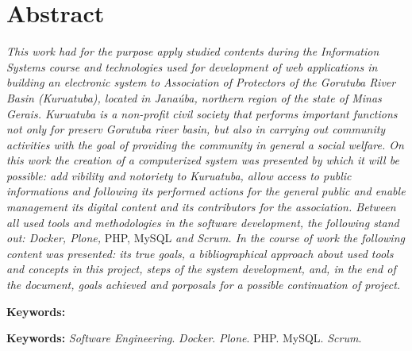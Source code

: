 \chapter*{Abstract}
\vspace{0.4cm}
\noindent \textit{This work had for  the purpose apply studied contents during the Information Systems course and technologies  used for development of web applications   in building an electronic system to Association of Protectors of the Gorutuba River Basin (Kuruatuba), located in Janaúba, northern region of the state of Minas Gerais. 
Kuruatuba is a 
non-profit civil society that performs important functions not only for preserv Gorutuba river basin, but also in carrying out community activities with the goal of providing the community in general a social welfare.
On this work the creation of a computerized system was presented by which it will be possible: add vibility and notoriety to Kuruatuba, allow access to public informations and following its performed actions for the general public and enable management its digital content and its contributors for the association.
Between all used tools and methodologies in the software development, the following stand out: Docker, Plone,} PHP, MySQL \textit{and Scrum.
In the course of work the following content was presented: its true goals, a bibliographical approach about used tools and concepts in this project, steps of the system development, and, in the end of the document, goals achieved and porposals for a possible continuation of project.}

\begin{labeling}{\textbf{Keywords:}}
\item[\textbf{Keywords:}] 
\textit{Software Engineering}.
\textit{Docker}.
\textit{Plone}.
PHP.
MySQL.
\textit{Scrum}.
\end{labeling}
